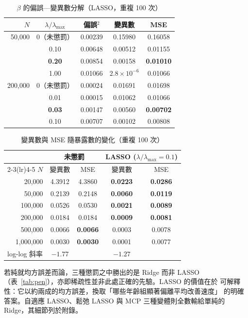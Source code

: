 \documentclass[UTF8, fontset=macnew, a4paper, 12pt]{ctexart}
\begin{document}
\begin{table}[H]
\centering
\caption{$\beta$ 的偏誤—變異數分解（LASSO，重複 100 次）}
\small
\begin{tabular}{rcccc}
\toprule
$N$ & $\lambda/\lambda_{\max}$ & 偏誤$^2$ & 變異數 & MSE\\
\midrule
50,000  & 0（未懲罰） & 0.00239 & 0.15980 & 0.16058\\
        & 0.10 & 0.00648 & 0.00512 & 0.01155\\
        & \textbf{0.20} & 0.00854 & 0.00158 & \textbf{0.01010}\\
        & 1.00 & 0.01066 & $2.8\times10^{-6}$ & 0.01066\\
\midrule
200,000 & 0（未懲罰） & 0.00024 & 0.01691 & 0.01698\\
        & 0.01 & 0.00015 & 0.01062 & 0.01066\\
        & \textbf{0.03} & 0.00147 & 0.00560 & \textbf{0.00702}\\
        & 0.10 & 0.00707 & 0.00102 & 0.00808\\
\bottomrule
\end{tabular}
\label{tab:bv}
\end{table}
\begin{table}[H]
\centering
\caption{變異數與 MSE 隨暴露數的變化（重複 100 次）}
\small
\begin{tabular}{rcccc}
\toprule
 & \multicolumn{2}{c}{未懲罰} & \multicolumn{2}{c}{LASSO ($\lambda/\lambda_{\max}=0.1$)}\\
\cmidrule(lr){2-3}\cmidrule(lr){4-5}
$N$ & 變異數 & MSE & 變異數 & MSE\\
\midrule
20,000    & 4.3912 & 4.3860 & \textbf{0.0223} & \textbf{0.0286}\\
50,000    & 0.2139 & 0.2148 & \textbf{0.0060} & \textbf{0.0119}\\
100,000   & 0.0526 & 0.0530 & \textbf{0.0021} & \textbf{0.0089}\\
200,000   & 0.0184 & 0.0184 & \textbf{0.0009} & \textbf{0.0081}\\
500,000   & 0.0066 & \textbf{0.0066} & 0.0003 & 0.0078\\
1,000,000 & 0.0030 & \textbf{0.0030} & 0.0001 & 0.0077\\
\midrule
\multicolumn{1}{l}{log-log 斜率} & $-1.77$ & & $-1.27$ & \\
\bottomrule
\end{tabular}
\label{tab:rate}
\end{table}

若純就均方誤差而論，三種懲罰之中勝出的是 Ridge 而非 LASSO
（表~\ref{tab:pen}），亦即稀疏性並非此處正確的先驗。LASSO 的價值在於
可解釋性：它以約兩成的均方誤差，換取「哪些年齡組顯著偏離平均改善速度」
的明確答案。自適應 LASSO、鬆弛 LASSO 與 MCP 三種變體則全數輸給單純的
Ridge，其細節列於附錄。
\end{document}
